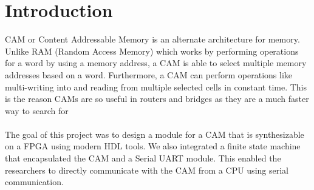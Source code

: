 \section{Introduction}
CAM or Content Addressable Memory is an alternate architecture for memory. Unlike RAM (Random Access Memory) which works by 
performing operations for a word by using a memory address, a CAM is able to select multiple memory addresses based on a word. 
Furthermore, a CAM can perform operations like multi-writing into and reading from multiple selected cells in constant time.
This is the reason CAMs are so useful in routers and bridges as they are a much faster way to search for 
\\\\   
The goal of this project was to design a module for a CAM that is synthesizable on a FPGA using modern HDL tools. 
We also integrated a finite state machine that encapsulated the CAM and a Serial UART module. 
This enabled the researchers to directly communicate with the CAM from a CPU using serial communication. 
